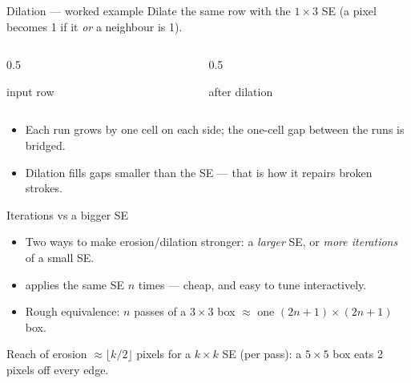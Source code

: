 \documentclass[10pt,aspectratio=169]{beamer}
\begin{document}
\begin{frame}{Dilation — worked example}
  Dilate the same row with the $1\times3$ SE (a pixel becomes 1 if it \emph{or} a neighbour is 1).
  \begin{columns}[T]
    \begin{column}{0.5\textwidth}\begin{center}
      {\scriptsize input row}\\[2pt]
    \end{center}\end{column}
    \begin{column}{0.5\textwidth}\begin{center}
      {\scriptsize after dilation}\\[2pt]
    \end{center}\end{column}
  \end{columns}
  \vspace{2pt}
  \begin{itemize}
    \item Each run grows by one cell on each side; the one-cell gap between the runs is bridged.
    \item Dilation fills gaps smaller than the SE — that is how it repairs broken strokes.
  \end{itemize}
\end{frame}

\begin{frame}{Iterations vs a bigger SE}
  \begin{itemize}
    \item Two ways to make erosion/dilation stronger: a \emph{larger} SE, or \emph{more iterations} of a small SE.
    \item {} applies the same SE $n$ times — cheap, and easy to tune interactively.
    \item Rough equivalence: $n$ passes of a $3\times3$ box $\approx$ one $(2n{+}1)\times(2n{+}1)$ box.
  \end{itemize}
  \begin{mathbox}
    Reach of erosion $\approx \lfloor k/2 \rfloor$ pixels for a $k\times k$ SE (per pass): a $5\times5$ box eats 2 pixels off every edge.
  \end{mathbox}
\end{frame}
\end{document}

